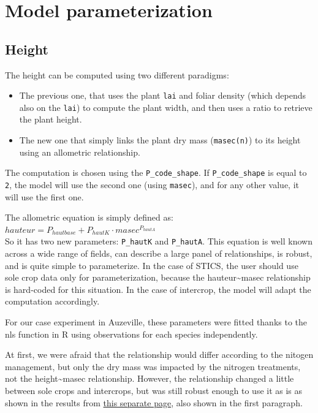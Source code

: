 \documentclass[
]{book}
\providecommand{\tightlist}{%
  \setlength{\itemsep}{0pt}\setlength{\parskip}{0pt}}
\begin{document}
\hypertarget{model-parameterization}{%
\section{Model parameterization}\label{model-parameterization}}

\hypertarget{height-1}{%
\subsection{Height}\label{height-1}}

The height can be computed using two different paradigms:

\begin{itemize}
\tightlist
\item
  The previous one, that uses the plant \texttt{lai} and foliar density (which depends also on the \texttt{lai}) to compute the plant width, and then uses a ratio to retrieve the plant height.\\
\item
  The new one that simply links the plant dry mass (\texttt{masec(n)}) to its height using an allometric relationship.
\end{itemize}

The computation is chosen using the \texttt{P\_code\_shape}. If \texttt{P\_code\_shape} is equal to \texttt{2}, the model will use the second one (using \texttt{masec}), and for any other value, it will use the first one.

The allometric equation is simply defined as:\\
\(hauteur= P_{hautbase} + P_{hautK} \cdot masec^{P_{hautA}}\)\\
So it has two new parameters: \texttt{P\_hautK} and \texttt{P\_hautA}.
This equation is well known across a wide range of fields, can describe a large panel of relationships, is robust, and is quite simple to parameterize. In the case of STICS, the user should use sole crop data only for parameterization, because the hauteur\textasciitilde masec relationship is hard-coded for this situation. In the case of intercrop, the model will adapt the computation accordingly.

For our case experiment in Auzeville, these parameters were fitted thanks to the nls function in R using observations for each species independently.

At first, we were afraid that the relationship would differ according to the nitogen management, but only the dry mass was impacted by the nitrogen treatments, not the height\textasciitilde masec relationship. However, the relationship changed a little between sole crops and intercrops, but was still robust enough to use it as is as shown in the results from \href{Auzeville_summary.html}{this separate page}, also shown in the first paragraph.
\end{document}
